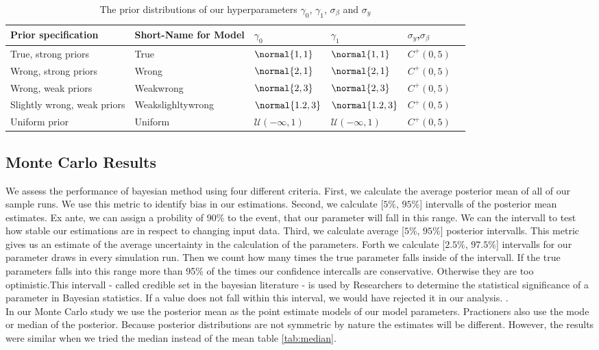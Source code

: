 \begin{table}[!ht]
\begin{center}
\begin{tabular}{l l l l l l}
Prior specification & Short-Name for Model & $\gamma_0$ & $\gamma_1$ & $\sigma_y$,$\sigma_\beta$\\
\hline
True, strong priors &  True & $\normal{1,1}$ & $\normal{1,1} $ & $C^+(0, 5)$\\
Wrong, strong priors & Wrong  &$\normal{2,1}$ & $\normal{2,1}$ & $C^+(0, 5)$\\
Wrong, weak priors &  Weakwrong  & $\normal{2,3}$ &$ \normal{2,3}$ & $C^+(0, 5)$\\
Slightly wrong, weak priors &  Weakslighltywrong & $ \normal{1.2,3}$ &$\normal{1.2,3}$ & $C^+(0, 5)$\\
Uniform prior & Uniform &$\mathcal{U(-\infty,1)}$ & $\mathcal{U(-\infty,1)}$ & $C^+(0, 5)$\\
\end{tabular}
\end{center}
\caption{The prior distributions of our hyperparameters $\gamma_0$, $\gamma_1$, $\sigma_\beta$ and  $\sigma_y$}
\label{tab:prior_table}
\end{table}


\subsection{Monte Carlo Results}

We assess the performance of bayesian method using four different criteria.
First, we calculate the average posterior mean of all of our sample runs. We use this metric to identify bias in our estimations. 
Second, we calculate [$5\text{\%}$, $95\text{\%}$] intervalls of the posterior mean estimates. Ex ante, we can assign a probility of 90\% to the event, that our parameter will fall in this range. We can the intervall to test how stable our estimations are in respect to changing input data. 
Third, we calculate average [$5\text{\%}$, $95\text{\%}$] posterior intervalls. This metric gives us an estimate of the average uncertainty in the calculation of the parameters.
Forth we calculate [$2.5\text{\%}$, $97.5\text{\%}$] intervalls for our parameter draws in every simulation run. Then we count how many times the true parameter falls  inside of the intervall. If the true parameters falls into this range more than 95\% of the times our confidence intercalls are conservative. Otherwise they are too optimistic.This intervall - called credible set in the bayesian literature - is used by Researchers to determine the statistical significance of a parameter in Bayesian statistics. If a value does not fall within this interval, we would have rejected it in our analysis. \cite{koop2003}.\\
In our Monte Carlo study we use the posterior mean as the point estimate models of our model parameters. Practioners also use the mode or median of the posterior. Because posterior distributions are not symmetric by nature the estimates will be different. However, the results were similar when we tried the median instead of the mean table \ref{tab:median}.\\


